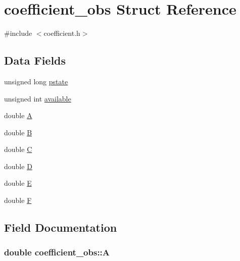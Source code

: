 \hypertarget{structcoefficient__obs}{}\section{coefficient\+\_\+obs Struct Reference}
\label{structcoefficient__obs}


{\ttfamily \#include $<$coefficient.\+h$>$}

\subsection*{Data Fields}
\begin{DoxyCompactItemize}
\item 
unsigned long \hyperlink{structcoefficient__obs_adecb824d8a854272d74d11cce7952518}{pstate}
\item 
unsigned int \hyperlink{structcoefficient__obs_a3069dc88f74c2a5a5e57441716e3a3a1}{available}
\item 
double \hyperlink{structcoefficient__obs_a647cf54a094cc55438fd68998745678c}{A}
\item 
double \hyperlink{structcoefficient__obs_a4a73df3da20d38f8202b88fa4545670b}{B}
\item 
double \hyperlink{structcoefficient__obs_a7830f44ef8756adb200c22fdb412e654}{C}
\item 
double \hyperlink{structcoefficient__obs_a24799e11ae2246845354e784a5014cb1}{D}
\item 
double \hyperlink{structcoefficient__obs_abcb46eec2e9ddd6097cf599c8753ca4a}{E}
\item 
double \hyperlink{structcoefficient__obs_a450b61c7f8ecd5cd3c3dd9281e5da992}{F}
\end{DoxyCompactItemize}


\subsection{Field Documentation}
\subsubsection[{\texorpdfstring{A}{A}}]{\setlength{\rightskip}{0pt plus 5cm}double coefficient\+\_\+obs\+::A}\hypertarget{structcoefficient__obs_a647cf54a094cc55438fd68998745678c}{}\label{structcoefficient__obs_a647cf54a094cc55438fd68998745678c}
